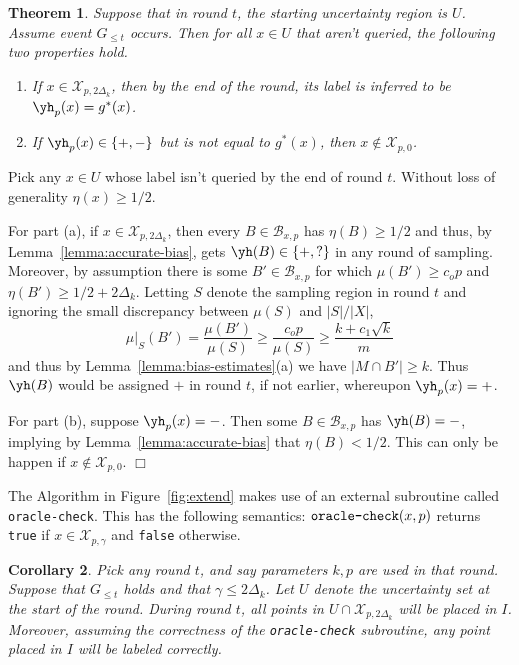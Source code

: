 \documentclass{article}
\def\X{{\mathcal X}}
\def\B{{\mathcal B}}
\newtheorem{thm}{Theorem}
\newtheorem{cor}[thm]{Corollary}
\newenvironment{proof}{\noindent {\sc Proof:}}{$\Box$ \medskip}
\begin{document}
\begin{thm}
Suppose that in round $t$, the starting uncertainty region is $U$. Assume event $G_{\leq t}$ occurs. Then for all $x \in U$ that aren't queried, the following two properties hold.
\begin{enumerate}
\item[(a)] If $x \in \X_{p,2\Delta_k}$, then by the end of the round, its label is inferred to be $\yh_{p}(x) = g^*(x)$.
\item[(b)] If $\yh_{p}(x) \in \{+,-\}$ but is not equal to $g^*(x)$, then $x \not\in \X_{p,0}$.
\end{enumerate}
\end{thm}
\begin{proof}
Pick any $x \in U$ whose label isn't queried by the end of round $t$. Without loss of generality $\eta(x) \geq 1/2$.

For part (a), if $x \in \X_{p,2\Delta_k}$, then every $B \in \B_{x,p}$ has $\eta(B) \geq 1/2$ and thus, by Lemma~\ref{lemma:accurate-bias}, gets $\yh(B) \in \{+,?\}$ in any round of sampling. Moreover, by assumption there is some $B' \in \B_{x,p}$ for which $\mu(B') \geq c_o p$ and $\eta(B') \geq 1/2 + 2\Delta_k$. Letting $S$ denote the sampling region in round $t$ and ignoring the small discrepancy between $\mu(S)$ and $|S|/|X|$,
$$ \mu|_S(B') = \frac{\mu(B')}{\mu(S)} \geq \frac{c_o p}{\mu(S)} \geq \frac{k + c_1 \sqrt{k}}{m}$$
and thus by Lemma~\ref{lemma:bias-estimates}(a) we have $|M \cap B'| \geq k$. Thus $\yh(B)$ would be assigned $+$ in round $t$, if not earlier, whereupon $\yh_p(x) = +$.

For part (b), suppose $\yh_{p}(x) = -$. Then some $B \in \B_{x,p}$ has $\yh(B) = -$, implying by Lemma~\ref{lemma:accurate-bias} that $\eta(B) < 1/2$. This can only be happen if $x \not\in \X_{p,0}$. 
\end{proof}

The Algorithm in Figure~\ref{fig:extend} makes use of an external subroutine called {\tt oracle-check}. This has the following semantics: $\mbox{\tt oracle-check}(x,p)$ returns {\tt true} if $x \in \X_{p,\gamma}$ and {\tt false} otherwise.

\begin{cor}
\item Pick any round $t$, and say parameters $k,p$ are used in that round. Suppose that $G_{\leq t}$ holds and that $\gamma \leq 2\Delta_k$. Let $U$ denote the uncertainty set at the start of the round. During round $t$, all points in $U \cap \X_{p,2\Delta_k}$ will be placed in $I$. Moreover, assuming the correctness of the {\tt oracle-check} subroutine, any point placed in $I$ will be labeled correctly.
\end{cor}
\end{document}
